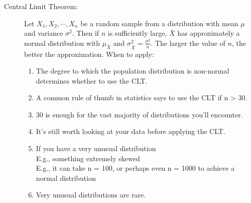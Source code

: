 \documentclass[10pt,landscape]{article}
\begin{document}
\begin{multicols}{3}
\begin{description}
\item[Central Limit Theorem:] Let $X_1, X_2, \cdots, X_n$ be a random sample from a distribution with mean $\mu$ and variance $\sigma^2$. Then if $n$ is sufficiently large, $\bar{X}$ has approximately a normal distribution with $\mu_{\bar{X}}$ and $\sigma_{\bar{X}}^2 = \frac{\sigma^2}{n}$. The larger the value of $n$, the better the approximation. When to apply:
  \begin{enumerate}
    \item The degree to which the population distribution is non-normal determines whether to use the CLT.
    \item A common rule of thumb in statistics says to use the CLT if n > 30.
    \item 30 is enough for the vast majority of distributions you'll encounter.
    \item It's still worth looking at your data before applying the CLT.
    \item If you have a very unusual distribution \\
        E.g., something extremely skewed \\
        E.g., it can take n = 100, or perhaps even n = 1000 to achieve a normal distribution\\
    \item Very unusual distributions are rare.
  \end{enumerate}

\end{description}

\end{multicols}
\end{document}
